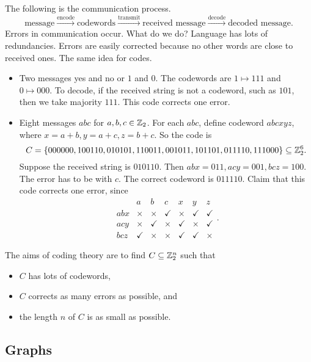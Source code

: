 The following is the communication process.
$$ \text{message} \xrightarrow{\text{encode}} \text{codewords} \xrightarrow{\text{transmit}} \text{received message} \xrightarrow{\text{decode}} \text{decoded message}. $$
Errors in communication occur. What do we do? Language has lots of redundancies. Errors are easily corrected because no other words are close to received ones. The same idea for codes.

\begin{example*}
\hfill
\begin{itemize}
\item Two messages yes and no or $ 1 $ and $ 0 $. The codewords are $ 1 \mapsto 111 $ and $ 0 \mapsto 000 $. To decode, if the received string is not a codeword, such as $ 101 $, then we take majority $ 111 $. This code corrects one error.
\item Eight messages $ abc $ for $ a, b, c \in \mathbb{Z}_2 $. For each $ abc $, define codeword $ abcxyz $, where $ x = a + b, y = a + c, z = b + c $. So the code is
$$ C = \cbr{000000, 100110, 010101, 110011, 001011, 101101, 011110, 111000} \subseteq \ZZ_2^6. $$
Suppose the received string is $ 010110 $. Then $ abx = 011, acy = 001, bcz = 100 $. The error has to be with $ c $. The correct codeword is $ 011110 $. Claim that this code corrects one error, since
$$
\begin{array}{c|cccccc}
& a & b & c & x & y & z \\
\hline
abx & \times & \times & \checkmark & \times & \checkmark & \checkmark \\
acy & \times & \checkmark & \times & \checkmark & \times & \checkmark \\
bcz & \checkmark & \times & \times & \checkmark & \checkmark & \times
\end{array}.
$$
\end{itemize}
\end{example*}

The aims of coding theory are to find $ C \subseteq \mathbb{Z}_2^n $ such that
\begin{itemize}
\item $ C $ has lots of codewords,
\item $ C $ corrects as many errors as possible, and
\item the length $ n $ of $ C $ is as small as possible.
\end{itemize}

\pagebreak

\subsection{Graphs}

